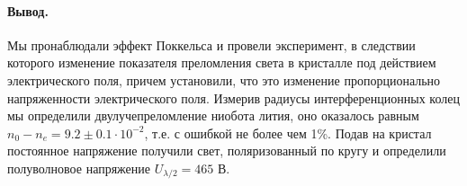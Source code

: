 \documentclass{letask}
\begin{document}
\paragraph{Вывод.} Мы пронаблюдали эффект Поккельса и провели эксперимент, в следствии которого изменение показателя преломления света в кристалле под действием электрического поля, причем установили, что это изменение пропорционально напряженности электрического поля. Измерив радиусы интерференционных колец мы определили двулучепреломление ниобота лития, оно оказалось равным $ n_0 - n_e = 9.2 \pm 0.1 \cdot 10^{-2} $, т.е. с ошибкой не более чем 1\%. Подав на кристал постоянное напряжение получили свет, поляризованный по кругу и определили полуволновое напряжение $ U_{\lambda/2} = 465  $ В.
\end{document}
